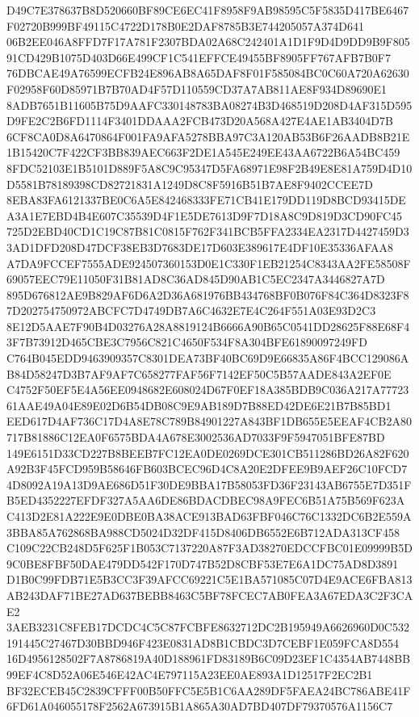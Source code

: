 \documentclass[UTF8,fontset=fandol,zihao=-4,a4paper]{ctexart}
\begin{document}
{{D49C7E378637B8D520660BF89CE6EC41F8958F9AB98595C5F5835D417BE6467F02720B999BF49115C4722D178B0E2DAF8785B3E744205057A374D641
06B2EE046A8FFD7F17A781F2307BDA02A68C242401A1D1F9D4D9DD9B9F80591CD429B1075D403D66E499CF1C541EFFCE49455BF8905FF767AFB7B0F7
76DBCAE49A76599ECFB24E896AB8A65DAF8F01F585084BC0C60A720A62630F02958F60D85971B7B70AD4F57D110559CD37A7AB811AE8F934D89690E1
8ADB7651B11605B75D9AAFC330148783BA08274B3D468519D208D4AF315D595D9FE2C2B6FD1114F3401DDAAA2FCB473D20A568A427E4AE1AB3404D7B
6CF8CA0D8A6470864F001FA9AFA5278BBA97C3A120AB53B6F26AADB8B21E1B15420C7F422CF3BB839AEC663F2DE1A545E249EE43AA6722B6A54BC459
8FDC52103E1B5101D889F5A8C9C95347D5FA68971E98F2B49E8E81A759D4D10D5581B78189398CD82721831A1249D8C8F5916B51B7AE8F9402CCEE7D
8EBA83FA6121337BE0C6A5E842468333FE71CB41E179DD119D8BCD93415DEA3A1E7EBD4B4E607C35539D4F1E5DE7613D9F7D18A8C9D819D3CD90FC45
725D2EBD40CD1C19C87B81C0815F762F341BCB5FFA2334EA2317D4427459D33AD1DFD208D47DCF38EB3D7683DE17D603E389617E4DF10E35336AFAA8
A7DA9FCCEF7555ADE924507360153D0E1C330F1EB21254C8343AA2FE58508F69057EEC79E11050F31B81AD8C36AD845D90AB1C5EC2347A3446827A7D
895D676812AE9B829AF6D6A2D36A681976BB434768BF0B076F84C364D8323F87D202754750972ABCFC7D4749DB7A6C4632E7E4C264F551A03E93D2C3
8E12D5AAE7F90B4D03276A28A8819124B6666A90B65C0541DD28625F88E68F43F7B73912D465CBE3C7956C821C4650F534F8A304BFE61890097249FD
C764B045EDD9463909357C8301DEA73BF40BC69D9E66835A86F4BCC129086AB84D58247D3B7AF9AF7C658277FAF56F7142EF50C5B57AADE843A2EF0E
C4752F50EF5E4A56EE0948682E608024D67F0EF18A385BDB9C036A217A7772361AAE49A04E89E02D6B54DB08C9E9AB189D7B88ED42DE6E21B7B85BD1
EED617D4AF736C17D4A8E78C789B84901227A843BF1DB655E5EEAF4CB2A80717B81886C12EA0F6575BDA4A678E3002536AD7033F9F5947051BFE87BD
149E6151D33CD227B8BEEB7FC12EA0DE0269DCE301CB511286BD26A82F620A92B3F45FCD959B58646FB603BCEC96D4C8A20E2DFEE9B9AEF26C10FCD7
4D8092A19A13D9AE686D51F30DE9BBA17B58053FD36F23143AB6755E7D351FB5ED4352227EFDF327A5AA6DE86BDACDBEC98A9FEC6B51A75B569F623A
C413D2E81A222E9E0DBE0BA38ACE913BAD63FBF046C76C1332DC6B2E559A3BBA85A762868BA988CD5024D32DF415D8406DB6552E6B712ADA313CF458
C109C22CB248D5F625F1B053C7137220A87F3AD38270EDCCFBC01E09999B5D9C0BE8FBF50DAE479DD542F170D747B52D8CBF53E7E6A1DC75AD8D3891
D1B0C99FDB71E5B3CC3F39AFCC69221C5E1BA571085C07D4E9ACE6FBA813AB243DAF71BE27AD637BEBB8463C5BF78FCEC7AB0FEA3A67EDA3C2F3CAE2
3AEB3231C8FEB17DCDC4C5C87FCBFE8632712DC2B195949A6626960D0C532191445C27467D30BBD946F423E0831AD8B1CBDC3D7CEBF1E059FCA8D554
16D4956128502F7A8786819A40D188961FD83189B6C09D23EF1C4354AB7448BB99EF4C8D52A06E546E42AC4E797115A23EE0AE893A1D12517F2EC2B1
BF32ECEB45C2839CFFF00B50FFC5E5B1C6AA289DF5FAEA24BC786ABE41F6FD61A046055178F2562A673915B1A865A30AD7BD407DF79370576A1156C7
}}
\end{document}
